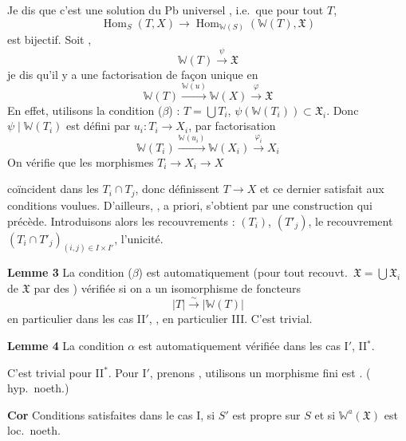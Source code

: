 \documentclass[11pt,a4paper]{article}
\begin{document}
Je dis que c'est une solution du Pb universel \ill{}, i.e.\ que
pour tout $T$,
\[
  \operatorname{Hom}_{S}(T, X) \to
  \operatorname{Hom}_{\mathbb{W}(S)}(\mathbb{W}(T), \mathfrak{X})
\]
est bijectif. Soit ,
\[
  \mathbb{W}(T) \xrightarrow{\ \psi\ } \mathfrak{X}
\]
je dis qu'il y a une factorisation de façon unique en
\[
  \mathbb{W}(T) \xrightarrow{\mathbb{W}(u)} \mathbb{W}(X)
  \xrightarrow{\ \varphi\ } \mathfrak{X}
\]
En effet,  
utilisons la condition ($\beta$) : $T = \bigcup T_i$, 
$\psi(\mathbb{W}(T_i)) \subset \mathfrak{X}_i$. Donc
$\psi \mid \mathbb{W}(T_i)$ est défini par $u_i\colon T_i \to X_i$, par
factorisation
\[
  \mathbb{W}(T_i) \xrightarrow{\mathbb{W}(u_i)} \mathbb{W}(X_i)
  \xrightarrow{\ \varphi_i\ } X_i
\]
On vérifie  que les morphismes $T_i \to X_i \to X$

coïncident dans les $T_i \cap T_j$, donc définissent $T \to X$
et ce dernier satisfait aux conditions
voulues. D'ailleurs,   \ill{} \ill{},
a priori, s'obtient par une construction   qui
précède. Introduisons alors les 
recouvrements : $(T_i)$, $(T'_j)$, le
recouvrement \ill{} $(T_i \cap T'_j)_{(i,j) \in I \times I'}$,
 l'unicité.

\textbf{Lemme 3} La condition ($\beta$) est automatiquement
(pour tout recouvt.\ $\mathfrak{X} = \bigcup \mathfrak{X}_i$ de $\mathfrak{X}$ par des
) vérifiée si on a un isomorphisme de foncteurs
\[
  |T| \xrightarrow{\ \sim\ } |\mathbb{W}(T)|
\]
en particulier dans les cas II$'$, \struck{\ill{}}, en
particulier III. C'est trivial.

\textbf{Lemme 4} La condition $\alpha$ est automatiquement vérifiée dans
les cas I$'$, II$^{*}$.

C'est trivial pour II$^{*}$. Pour I$'$, prenons
 \ill{}, utilisons  un morphisme fini est
. ( hyp.\ noeth.)

\textbf{Cor} Conditions \uncertain{(\ill{})} satisfaites dans le
cas I, si $S'$ est propre sur $S$ et si $\mathbb{W}^{a}(\mathfrak{X})$ est
loc.\ noeth.
\end{document}

